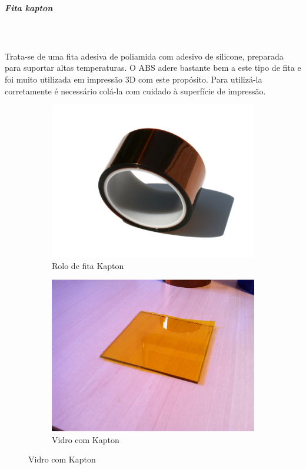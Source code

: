 \documentclass[11pt,a4paper]{article}
\begin{document}
				\subparagraph{Fita kapton}\mbox{}\\\\
Trata-se de uma fita adesiva de poliamida com adesivo de silicone, preparada para suportar altas temperaturas. O ABS adere bastante bem a este tipo de fita e foi muito utilizada em impressão 3D com este propósito. Para utilizá-la corretamente é necessário colá-la com cuidado à superfície de impressão.
\begin{figure}[H]
    \centering
    \begin{subfigure}[b]{0.4\textwidth}
        \includegraphics[width=\textwidth,cfbox=azul_marcos 4pt 0pt]{FOTOS/KAPTON1}
	\caption*{Rolo de fita Kapton}
    \end{subfigure}
    \qquad %
    \begin{subfigure}[b]{0.4\textwidth}
        \includegraphics[width=\textwidth,cfbox=azul_marcos 4pt 0pt]{FOTOS/KAPTON2}
	\caption*{Vidro com Kapton}
    \end{subfigure}   
\end{figure}
\end{document}
